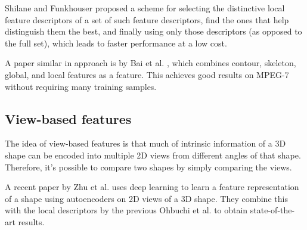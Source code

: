 \documentclass[../tech_report_1.tex]{subfiles}
\begin{document}
Shilane and Funkhouser \cite{shilane2006selecting} proposed a scheme for selecting the distinctive local feature descriptors of a set of such feature descriptors, find the ones that help distinguish them the best, and finally using only those descriptors (as opposed to the full set), which leads to faster performance at a low cost.

A paper similar in approach is by Bai et al. \cite{bai2009integrating}, which combines contour, skeleton, global, and local features as a feature. This achieves good results on MPEG-7 without requiring many training samples.

\subsection{View-based features}

The idea of view-based features is that much of intrinsic information of a 3D shape can be encoded into multiple 2D views from different angles of that shape. Therefore, it's possible to compare two shapes by simply comparing the views.

A recent paper by Zhu et al. \cite{zhu2016deep} uses deep learning to learn a feature representation of a shape using autoencoders on 2D views of a 3D shape. They combine this with the local descriptors by the previous Ohbuchi et al. \cite{ohbuchi2008salient} to obtain state-of-the-art results. 
\end{document}
